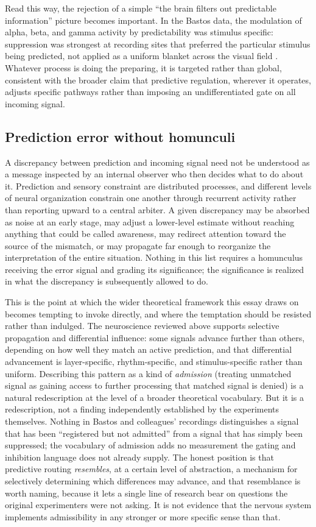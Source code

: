 \documentclass[11pt]{article}
\begin{document}
Read this way, the rejection of a simple ``the brain filters out predictable information'' picture becomes important. In the Bastos data, the modulation of alpha, beta, and gamma activity by predictability was stimulus specific: suppression was strongest at recording sites that preferred the particular stimulus being predicted, not applied as a uniform blanket across the visual field \citep{Bastos2020}. Whatever process is doing the preparing, it is targeted rather than global, consistent with the broader claim that predictive regulation, wherever it operates, adjusts specific pathways rather than imposing an undifferentiated gate on all incoming signal.

\subsection{Prediction error without homunculi}

A discrepancy between prediction and incoming signal need not be understood as a message inspected by an internal observer who then decides what to do about it. Prediction and sensory constraint are distributed processes, and different levels of neural organization constrain one another through recurrent activity rather than reporting upward to a central arbiter. A given discrepancy may be absorbed as noise at an early stage, may adjust a lower-level estimate without reaching anything that could be called awareness, may redirect attention toward the source of the mismatch, or may propagate far enough to reorganize the interpretation of the entire situation. Nothing in this list requires a homunculus receiving the error signal and grading its significance; the significance is realized in what the discrepancy is subsequently allowed to do.

This is the point at which the wider theoretical framework this essay draws on becomes tempting to invoke directly, and where the temptation should be resisted rather than indulged. The neuroscience reviewed above supports selective propagation and differential influence: some signals advance further than others, depending on how well they match an active prediction, and that differential advancement is layer-specific, rhythm-specific, and stimulus-specific rather than uniform. Describing this pattern as a kind of \emph{admission} (treating unmatched signal as gaining access to further processing that matched signal is denied) is a natural redescription at the level of a broader theoretical vocabulary. But it is a redescription, not a finding independently established by the experiments themselves. Nothing in Bastos and colleagues' recordings distinguishes a signal that has been ``registered but not admitted'' from a signal that has simply been suppressed; the vocabulary of admission adds no measurement the gating and inhibition language does not already supply. The honest position is that predictive routing \emph{resembles}, at a certain level of abstraction, a mechanism for selectively determining which differences may advance, and that resemblance is worth naming, because it lets a single line of research bear on questions the original experimenters were not asking. It is not evidence that the nervous system implements admissibility in any stronger or more specific sense than that.
\end{document}
